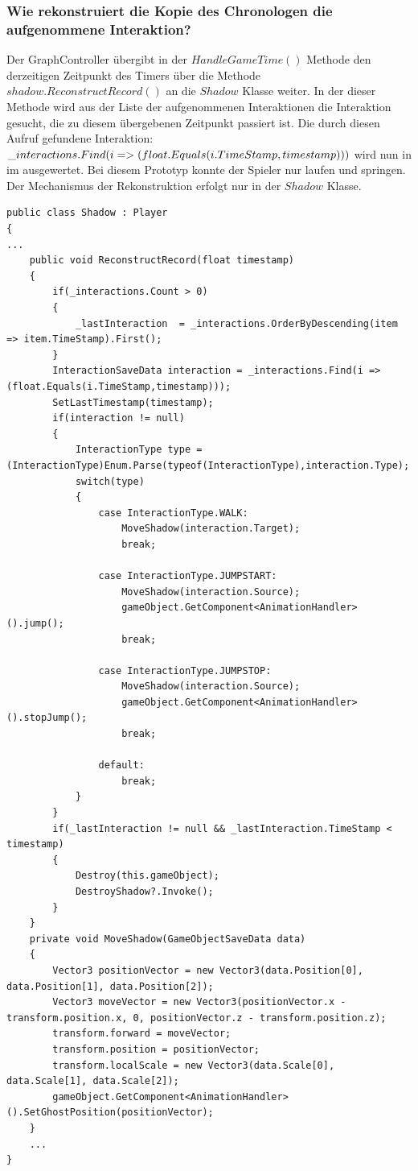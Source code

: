 \subsubsection{Wie rekonstruiert die Kopie des Chronologen die aufgenommene Interaktion?}\label{sec:good_04}
Der GraphController übergibt in der $HandleGameTime()$ Methode den derzeitigen Zeitpunkt des Timers über die Methode $ shadow.ReconstructRecord()$ an die $Shadow$ Klasse weiter. In der dieser Methode wird aus der Liste der aufgenommenen Interaktionen die Interaktion gesucht, die zu diesem übergebenen Zeitpunkt passiert ist. Die durch diesen Aufruf gefundene Interaktion: $\_interactions.Find(i => \\(float.Equals(i.TimeStamp,timestamp)))$ wird nun in im  ausgewertet. Bei diesem Prototyp konnte der Spieler nur laufen und springen.
Der Mechanismus der Rekonstruktion erfolgt nur in der $Shadow$ Klasse.
\begin{lstlisting}[caption={Rekonstruktionsmethode aus Shadow.cs}, label={sec:reconstructing_old}]
public class Shadow : Player
{ 
...
    public void ReconstructRecord(float timestamp)
    {
        if(_interactions.Count > 0)
        {
            _lastInteraction  = _interactions.OrderByDescending(item => item.TimeStamp).First();
        }
        InteractionSaveData interaction = _interactions.Find(i => (float.Equals(i.TimeStamp,timestamp)));
        SetLastTimestamp(timestamp);
        if(interaction != null)
        {
            InteractionType type = (InteractionType)Enum.Parse(typeof(InteractionType),interaction.Type);
            switch(type)
            {
                case InteractionType.WALK:
                    MoveShadow(interaction.Target);
                    break;

                case InteractionType.JUMPSTART:
                    MoveShadow(interaction.Source);
                    gameObject.GetComponent<AnimationHandler>().jump();
                    break;

                case InteractionType.JUMPSTOP:
                    MoveShadow(interaction.Source);
                    gameObject.GetComponent<AnimationHandler>().stopJump();
                    break;

                default:
                    break;
            }
        }
        if(_lastInteraction != null && _lastInteraction.TimeStamp < timestamp)
        {
            Destroy(this.gameObject);
            DestroyShadow?.Invoke();
        }
    }
    private void MoveShadow(GameObjectSaveData data)
    {
        Vector3 positionVector = new Vector3(data.Position[0], data.Position[1], data.Position[2]);
        Vector3 moveVector = new Vector3(positionVector.x - transform.position.x, 0, positionVector.z - transform.position.z);
        transform.forward = moveVector;
        transform.position = positionVector;
        transform.localScale = new Vector3(data.Scale[0], data.Scale[1], data.Scale[2]);
        gameObject.GetComponent<AnimationHandler>().SetGhostPosition(positionVector);
    }
    ...
}
\end{lstlisting}

